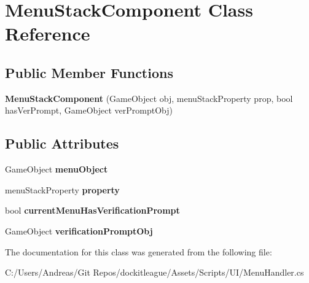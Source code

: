 \hypertarget{class_menu_stack_component}{}\section{Menu\+Stack\+Component Class Reference}
\label{class_menu_stack_component}
\subsection*{Public Member Functions}
\begin{DoxyCompactItemize}
\item 
\hypertarget{class_menu_stack_component_aa4a6c8046c99ec5712cc46487f61baeb}{}\label{class_menu_stack_component_aa4a6c8046c99ec5712cc46487f61baeb} 
{\bfseries Menu\+Stack\+Component} (Game\+Object obj, menu\+Stack\+Property prop, bool has\+Ver\+Prompt, Game\+Object ver\+Prompt\+Obj)
\end{DoxyCompactItemize}
\subsection*{Public Attributes}
\begin{DoxyCompactItemize}
\item 
\hypertarget{class_menu_stack_component_a54f57e4061ba527034974c4b31ef6b7b}{}\label{class_menu_stack_component_a54f57e4061ba527034974c4b31ef6b7b} 
Game\+Object {\bfseries menu\+Object}
\item 
\hypertarget{class_menu_stack_component_a5db620e589686d56addef8b006910cee}{}\label{class_menu_stack_component_a5db620e589686d56addef8b006910cee} 
menu\+Stack\+Property {\bfseries property}
\item 
\hypertarget{class_menu_stack_component_aec2a716261e39a02cccbfae44bce71da}{}\label{class_menu_stack_component_aec2a716261e39a02cccbfae44bce71da} 
bool {\bfseries current\+Menu\+Has\+Verification\+Prompt}
\item 
\hypertarget{class_menu_stack_component_a99e8d8f3f5da804befd525594f0bd059}{}\label{class_menu_stack_component_a99e8d8f3f5da804befd525594f0bd059} 
Game\+Object {\bfseries verification\+Prompt\+Obj}
\end{DoxyCompactItemize}


The documentation for this class was generated from the following file\+:\begin{DoxyCompactItemize}
\item 
C\+:/\+Users/\+Andreas/\+Git Repos/dockitleague/\+Assets/\+Scripts/\+U\+I/Menu\+Handler.\+cs\end{DoxyCompactItemize}
